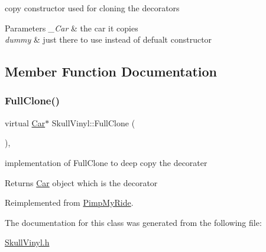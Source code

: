 copy constructor used for cloning the decorators 
\begin{DoxyParams}{Parameters}
{\em \+\_\+\+Car} & the car it copies \\
\hline
{\em dummy} & just there to use instead of defualt constructor \\
\hline
\end{DoxyParams}


\subsection{Member Function Documentation}
\mbox{\label{class_skull_vinyl_a02a74e1366553be8263a5751239bb8bf}} 
\subsubsection{\texorpdfstring{Full\+Clone()}{FullClone()}}
{\footnotesize\ttfamily virtual \mbox{\hyperlink{class_car}{Car}}$\ast$ Skull\+Vinyl\+::\+Full\+Clone (\begin{DoxyParamCaption}{ }\end{DoxyParamCaption})\hspace{0.3cm}{\ttfamily [inline]}, {\ttfamily [virtual]}}

implementation of Full\+Clone to deep copy the decorater \begin{DoxyReturn}{Returns}
\mbox{\hyperlink{class_car}{Car}} object which is the decorator 
\end{DoxyReturn}


Reimplemented from \mbox{\hyperlink{class_pimp_my_ride_afce12a1a761727eebec707924521d0e2}{Pimp\+My\+Ride}}.



The documentation for this class was generated from the following file\+:\begin{DoxyCompactItemize}
\item 
\mbox{\hyperlink{_skull_vinyl_8h}{Skull\+Vinyl.\+h}}\end{DoxyCompactItemize}
